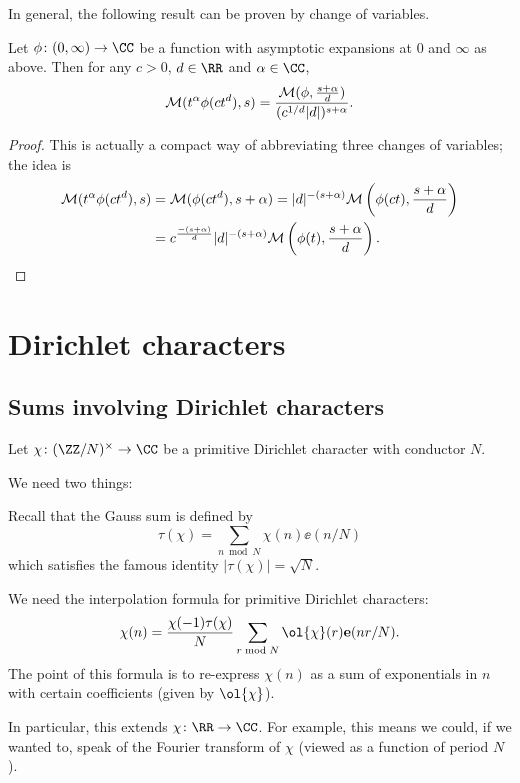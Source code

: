In general, the following result
can be proven by change of variables.
\begin{proposition}
  \label{prop:usubmellin}
  Let $\phi \colon (0,\infty) \to \CC$ be a function
  with asymptotic expansions at $0$ and $\infty$ as above.
  Then for any $c > 0$, $d \in \RR$ and $\alpha \in \CC$,
  \[ \mathcal M(t^\alpha \phi(ct^d), s)
    = \frac{\mathcal M(\phi, \frac{s+\alpha}{d})}
    {(c^{1/d}|d|)^{s+\alpha}}. \]
\end{proposition}
\begin{proof}
  This is actually a compact way of abbreviating three changes
  of variables; the idea is
  \begin{align*}
    \mathcal M(t^\alpha \phi(ct^d), s)
    &= \mathcal M(\phi(ct^d), s+\alpha)
      = |d|^{-(s+\alpha)}
      \mathcal M\left(\phi(ct), \frac{s+\alpha}{d} \right) \\
    &= c^{\frac{-(s+\alpha)}{d}}
      |d|^{-(s+\alpha)}
      \mathcal M\left(\phi(t), \frac{s+\alpha}{d} \right). \qedhere
  \end{align*}
\end{proof}


\section{Dirichlet characters}
\subsection{Sums involving Dirichlet characters}
Let $\chi \colon (\ZZ/N)^\times \to \CC$
be a primitive Dirichlet character with conductor $N$.

We need two things:
\begin{itemize}
  \ii Recall that the \alert{Gauss sum} is defined by
  \[ \tau(\chi) = \sum_{n \bmod N} \chi(n) \ee(n/N) \]
  which satisfies the famous
  identity $|\tau(\chi)| = \sqrt N$.

  \ii We need the interpolation formula for
  primitive Dirichlet characters:
  \[ \chi(n) = \frac{\chi(-1)\tau(\chi)}{N}
    \sum_{r \bmod N} \ol{\chi}(r) \ee(nr/N).  \]
  The point of this formula is to re-express $\chi(n)$
  as a sum of exponentials in $n$
  with certain coefficients (given by $\ol{\chi}$).

  In particular, this extends $\chi \colon \RR \to \CC$.
  For example, this means we could,
  if we wanted to, speak of the Fourier transform
  of $\chi$ (viewed as a function of period $N$).
\end{itemize}

